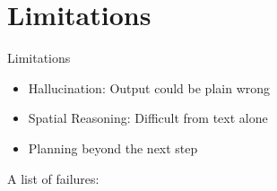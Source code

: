 \section{Limitations}

\begin{frame}[c]{Limitations} 
    \large
    \begin{itemize}[<+(1)->]
        \item Hallucination: Output could be plain wrong
        \item Spatial Reasoning: Difficult from text alone
        \item Planning beyond the next step
    \end{itemize}
    \pause
    A list of failures: \cite{borji_categorical_2023}
\end{frame}

% 
% 
% 

